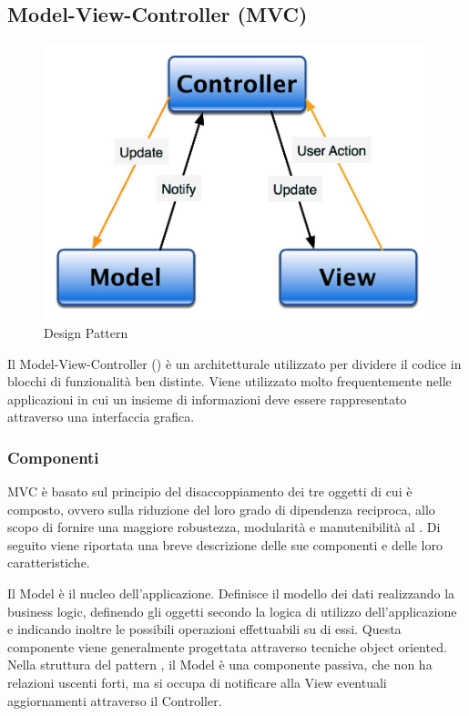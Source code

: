 \documentclass[a4paper, titlepage]{article}
\begin{document}
\subsection{Model-View-Controller (MVC)}
\begin{figure}[htp]
\centering
\includegraphics[scale=0.50]{Img/MVC.jpg}
\caption{Design Pattern }
\label{} 
\end{figure}
Il Model-View-Controller () è un  architetturale utilizzato per dividere il codice in blocchi di funzionalità ben distinte. Viene utilizzato molto frequentemente nelle applicazioni in cui un insieme di informazioni deve essere rappresentato attraverso una interfaccia grafica.

\subsubsection{Componenti}
MVC è basato sul principio del disaccoppiamento dei tre oggetti di cui è composto, ovvero sulla riduzione del loro grado di dipendenza reciproca, allo scopo di fornire una maggiore robustezza, modularità e manutenibilità al .
\newline Di seguito viene riportata una breve descrizione delle sue componenti e delle loro caratteristiche.

Il Model è il nucleo dell’applicazione. Definisce il modello dei dati realizzando la business logic, definendo gli oggetti secondo la logica di utilizzo dell’applicazione e indicando inoltre le possibili operazioni effettuabili su di essi.
\newline Questa componente viene generalmente progettata attraverso tecniche object oriented.
\newline Nella struttura del pattern , il Model è una componente passiva, che non ha relazioni uscenti forti, ma si occupa di notificare alla View eventuali aggiornamenti attraverso il Controller.
\end{document}
